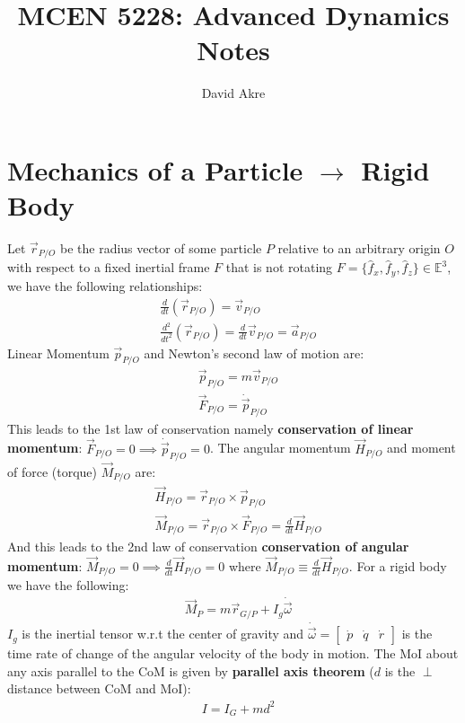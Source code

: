 \documentclass[conference]{IEEEtran}
\begin{document}
\title{MCEN 5228: Advanced Dynamics Notes}

\author{David Akre}

\maketitle

\section{Mechanics of a Particle $\to$ Rigid Body}
Let $\vec{r}_{P/O}$ be the radius vector of some particle $P$ relative to an arbitrary origin $O$ with respect to a fixed inertial frame $F$ that is not rotating $F = \{\hat{f}_x, \hat{f}_y, \hat{f}_z\} \in \mathbb{E}^3$, we have the following relationships:
\begin{align}
    & \frac{d}{dt}(\vec{r}_{P/O}) = \vec{v}_{P/O} \\
    & \frac{d^2}{dt^2}(\vec{r}_{P/O}) = \frac{d}{dt}{\vec{v}_{P/O}} = \vec{a}_{P/O}
\end{align}
Linear Momentum $\vec{p}_{P/O}$ and Newton's second law of motion are:
\begin{align}
    & \vec{p}_{P/O} = m \vec{v}_{P/O} \\
    & \vec{F}_{P/O} = \dot{\vec{p}}_{P/O}
\end{align}
This leads to the 1st law of conservation namely \textbf{conservation of linear momentum}: $\vec{F}_{P/O} = 0 \implies \dot{\vec{p}}_{P/O} = 0$. The angular momentum $\vec{H}_{P/O}$ and moment of force (torque) $\vec{M}_{P/O}$ are:
\begin{align}
    & \vec{H}_{P/O} = \vec{r}_{P/O} \times \vec{p}_{P/O} \\
    & \vec{M}_{P/O} = \vec{r}_{P/O} \times \vec{F}_{P/O} = \frac{d}{dt}\vec{H}_{P/O}
\end{align}
And this leads to the 2nd law of conservation \textbf{conservation of angular momentum}: $\vec{M}_{P/O} = 0 \implies \frac{d}{dt}\vec{H}_{P/O} = 0$ where $\vec{M}_{P/O} \equiv \frac{d}{dt}\vec{H}_{P/O}$. For a rigid body we have the following:
\begin{align}
    & \vec{M}_P = m \vec{r}_{G/P} + I_g \dot{\vec{\omega}}
\end{align}
$I_g$ is the inertial tensor w.r.t the center of gravity and $\dot{\vec{\omega}} = \begin{bmatrix} \dot{p} & \dot{q} & \dot{r} \end{bmatrix}$ is the time rate of change of the angular velocity of the body in motion. The MoI about any axis parallel to the CoM is given by \textbf{parallel axis theorem} ($d$ is the $\perp$ distance between CoM and MoI):
\begin{align}
    & I = I_G + m d^2
\end{align}
\end{document}
